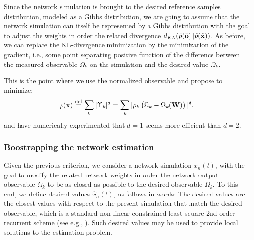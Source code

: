 Since the network simulation is brought to the desired reference samples distribution, modeled as a Gibbs distribution, we are going to assume that the network simulation can itself be represented by a Gibbs distribution with the goal to adjust the weights in order the related divergence $d_{KL}(\bar{p}(\bar{\bf o})\|\tilde{p}(\tilde{\bf x}))$. As before, we can replace the KL-divergence minimization by the minimization of the gradient, i.e., some point separating positive function of the difference between the measured observable ${\Omega}_{k}$ on the simulation and the desired value $\bar{\Omega}_{k}$.

This is the point where we use the normalized observable and propose to minimize:
\begin{equation} \label{kl-criterion} \rho({\bf x}) \stackrel {\rm def}{=} \sum_k |\Upsilon_k|^d = \sum_k |\rho_k\left(\bar{\Omega}_{k} - {\Omega}_{k}({\bf W})\right)|^d.\end{equation}
and have numerically experimented that $d=1$ seems more efficient than $d=2$.

\subsubsection*{Boostrapping the network estimation}

Given the previous criterion, we consider a network simulation $x_n(t)$, with the goal to modify the related network weights in order the network output observable ${\Omega}_k$ to be as closed as possible to the desired observable $\bar{\Omega}_k$. To this end, we define desired values $\hat{x}_n(t)$, as follows
in words: The desired values are the closest values with respect to the present simulation that match the desired observable, which is a standard non-linear constrained least-square 2nd order recurrent scheme (see e.g., \cite{vieville:inria-00074888}). Such desired values may be used to provide local solutions to the estimation problem.


